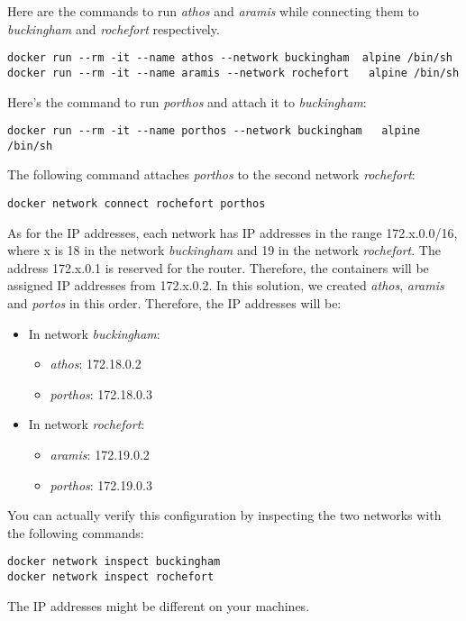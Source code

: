 \documentclass[
]{article}
\providecommand{\tightlist}{%
  \setlength{\itemsep}{0pt}\setlength{\parskip}{0pt}}
\newenvironment{infobox}[1]
  {
  \begin{itemize}
  \renewcommand{\labelitemi}{
    \raisebox{-.7\height}[0pt][0pt]{
      
    }
  }
  \setlength{\fboxsep}{1em}
  \begin{whitebox}
  \item
  }
  {
  \end{whitebox}
  \end{itemize}
  }
\theoremstyle{definition}
\theoremstyle{definition}
\theoremstyle{definition}
\theoremstyle{remark}
\begin{document}
\begin{infobox}{exercisebox}

Here are the commands to run \emph{athos} and \emph{aramis} while connecting
them to \emph{buckingham} and \emph{rochefort} respectively.

\begin{verbatim}
docker run --rm -it --name athos --network buckingham  alpine /bin/sh
docker run --rm -it --name aramis --network rochefort   alpine /bin/sh
\end{verbatim}

Here's the command to run \emph{porthos} and attach it to
\emph{buckingham}:

\begin{verbatim}
docker run --rm -it --name porthos --network buckingham   alpine /bin/sh
\end{verbatim}

The following command attaches \emph{porthos} to the second network \emph{rochefort}:

\begin{verbatim}
docker network connect rochefort porthos
\end{verbatim}

As for the IP addresses, each network has IP addresses
in the range 172.x.0.0/16, where x is 18 in the
network \emph{buckingham} and 19 in the network \emph{rochefort}.
The address 172.x.0.1 is reserved for the router.
Therefore, the containers will be assigned
IP addresses from 172.x.0.2.
In this solution, we created \emph{athos}, \emph{aramis} and \emph{portos}
in this order.
Therefore, the IP addresses will be:

\begin{itemize}
\tightlist
\item
  In network \emph{buckingham}:

  \begin{itemize}
  \tightlist
  \item
    \emph{athos}: 172.18.0.2
  \item
    \emph{porthos}: 172.18.0.3
  \end{itemize}
\item
  In network \emph{rochefort}:

  \begin{itemize}
  \tightlist
  \item
    \emph{aramis}: 172.19.0.2
  \item
    \emph{porthos}: 172.19.0.3
  \end{itemize}
\end{itemize}

You can actually verify this configuration by inspecting
the two networks with the following commands:

\begin{verbatim}
docker network inspect buckingham
docker network inspect rochefort
\end{verbatim}

The IP addresses might be different on your machines.

\end{infobox}
\end{document}

